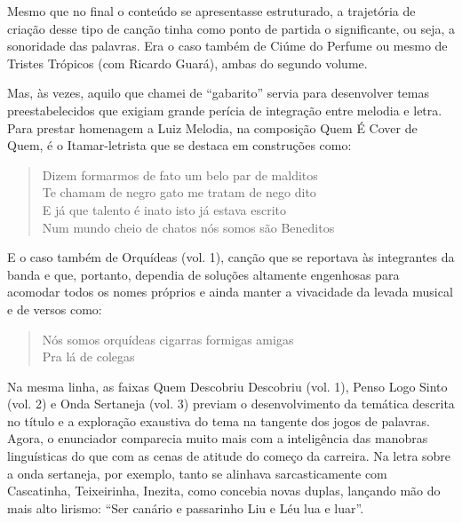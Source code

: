 Mesmo que no final o conteúdo se apresentasse estruturado, a trajetória
de criação desse tipo de canção tinha como ponto de partida o
significante, ou seja, a sonoridade das palavras. Era o caso também de
Ciúme do Perfume ou mesmo de Tristes Trópicos (com Ricardo Guará), ambas
do segundo volume.

Mas, às vezes, aquilo que chamei de ``gabarito'' servia para desenvolver
temas preestabelecidos que exigiam grande perícia de integração entre
melodia e letra. Para prestar homenagem a Luiz Melodia, na composição
Quem É Cover de Quem, é o Itamar-letrista que se destaca em construções
como:

\begin{verse}
Dizem formarmos de fato um belo par de malditos\\
Te chamam de negro gato me tratam de nego dito\\
E já que talento é inato isto já estava escrito\\
Num mundo cheio de chatos nós somos são Beneditos
\end{verse}

E o caso também de Orquídeas (vol. 1), canção que se reportava às
integrantes da banda e que, portanto, dependia de soluções altamente
engenhosas para acomodar todos os nomes próprios e ainda manter a
vivacidade da levada musical e de versos como:

\begin{verse}
Nós somos orquídeas cigarras formigas amigas\\
Pra lá de colegas
\end{verse}

Na mesma linha, as faixas Quem Descobriu Descobriu (vol. 1), Penso Logo
Sinto (vol. 2) e Onda Sertaneja (vol. 3) previam o desenvolvimento da
temática descrita no título e a exploração exaustiva do tema na tangente
dos jogos de palavras. Agora, o enunciador comparecia muito mais com a
inteligência das manobras linguísticas do que com as cenas de atitude do
começo da carreira. Na letra sobre a onda sertaneja, por exemplo, tanto
se alinhava sarcasticamente com Cascatinha, Teixeirinha, Inezita, como
concebia novas duplas, lançando mão do mais alto lirismo: ``Ser canário
e passarinho Liu e Léu lua e luar''.


